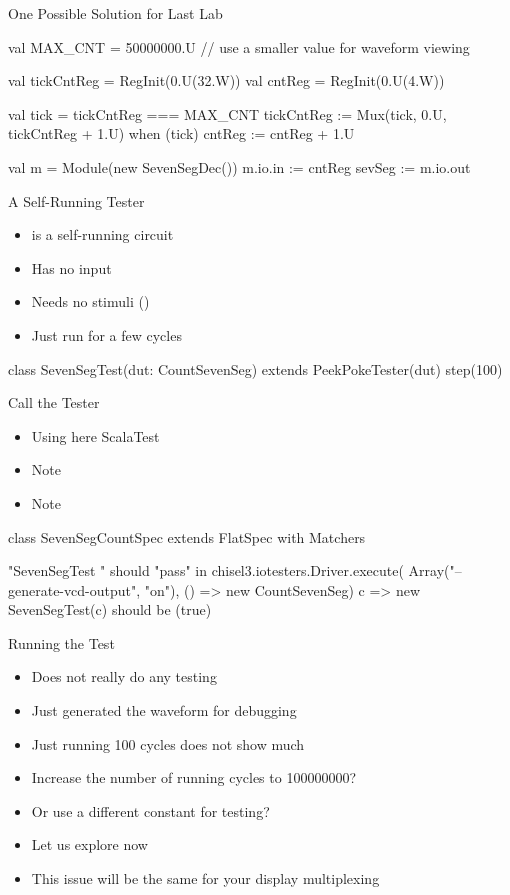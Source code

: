 \begin{frame}[fragile]{One Possible Solution for Last Lab}
\begin{chisel}
  val MAX_CNT = 50000000.U // use a smaller value for waveform viewing
  
  val tickCntReg = RegInit(0.U(32.W))
  val cntReg = RegInit(0.U(4.W))
  
  val tick = tickCntReg === MAX_CNT
  tickCntReg := Mux(tick, 0.U, tickCntReg + 1.U)
  when (tick) {
    cntReg := cntReg + 1.U
  }
  
  val m = Module(new SevenSegDec())
  m.io.in := cntReg
  sevSeg := m.io.out
\end{chisel}
\end{frame}

\begin{frame}[fragile]{A Self-Running Tester}
\begin{itemize}
\item {} is a self-running circuit
\item Has no input
\item Needs no stimuli ()
\item Just run for a few cycles
\end{itemize}
\begin{chisel}
class SevenSegTest(dut: CountSevenSeg) extends PeekPokeTester(dut) {
  step(100)
}
\end{chisel}
\end{frame}

\begin{frame}[fragile]{Call the Tester}
\begin{itemize}
\item Using here ScalaTest
\item Note 
\item Note 
\end{itemize}
\begin{chisel}
class SevenSegCountSpec extends
  FlatSpec with Matchers {
  
  "SevenSegTest " should "pass" in {
      chisel3.iotesters.Driver.execute(
      Array("--generate-vcd-output", "on"),
      () => new CountSevenSeg)
        { c => new SevenSegTest(c)}
        should be (true)
	}
}
\end{chisel}
\end{frame}

\begin{frame}[fragile]{Running the Test}
\begin{itemize}
\item Does not really do any testing
\item Just generated the waveform for debugging
\item Just running 100 cycles does not show much
\item Increase the number of running cycles to 100000000?
\item Or use a different constant for testing?
\item Let us explore now
\item This issue will be the same for your display multiplexing
\end{itemize}
\end{frame}

